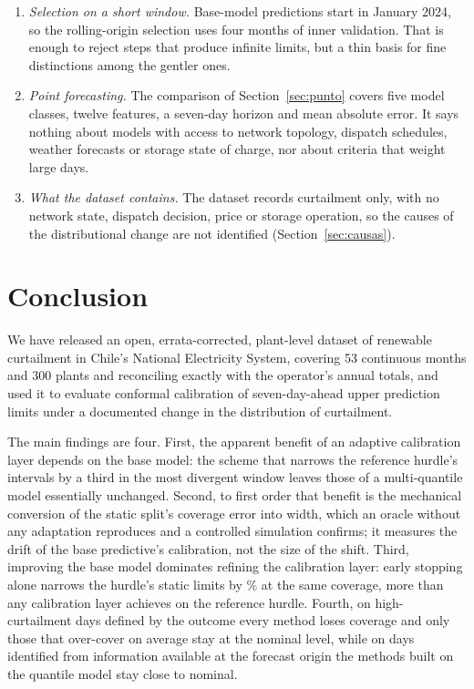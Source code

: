 \begin{enumerate}
\item \emph{Selection on a short window.} Base-model predictions start in January 2024, so the rolling-origin selection uses four months of inner validation. That is enough to reject steps that produce infinite limits, but a thin basis for fine distinctions among the gentler ones.
\item \emph{Point forecasting.} The comparison of Section~\ref{sec:punto} covers five model classes, twelve features, a seven-day horizon and mean absolute error. It says nothing about models with access to network topology, dispatch schedules, weather forecasts or storage state of charge, nor about criteria that weight large days.
\item \emph{What the dataset contains.} The dataset records curtailment only, with no network state, dispatch decision, price or storage operation, so the causes of the distributional change are not identified (Section~\ref{sec:causas}).
\end{enumerate}

\section{Conclusion}
\label{sec:conclusion}

We have released an open, errata-corrected, plant-level dataset of renewable curtailment in Chile's National Electricity System, covering 53 continuous months and 300 plants and reconciling exactly with the operator's annual totals, and used it to evaluate conformal calibration of seven-day-ahead upper prediction limits under a documented change in the distribution of curtailment.

The main findings are four. First, the apparent benefit of an adaptive calibration layer depends on the base model: the scheme that narrows the reference hurdle's intervals by a third in the most divergent window leaves those of a multi-quantile model essentially unchanged. Second, to first order that benefit is the mechanical conversion of the static split's coverage error into width, which an oracle without any adaptation reproduces and a controlled simulation confirms; it measures the drift of the base predictive's calibration, not the size of the shift. Third, improving the base model dominates refining the calibration layer: early stopping alone narrows the hurdle's static limits by \% at the same coverage, more than any calibration layer achieves on the reference hurdle. Fourth, on high-curtailment days defined by the outcome every method loses coverage and only those that over-cover on average stay at the nominal level, while on days identified from information available at the forecast origin the methods built on the quantile model stay close to nominal.

